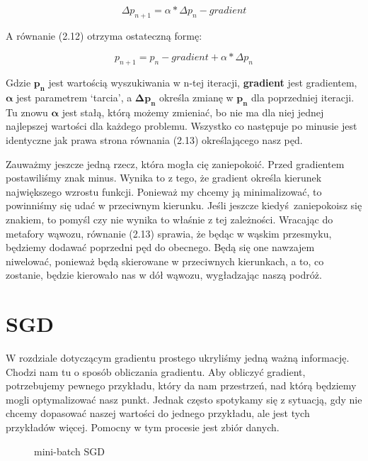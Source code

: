 \begin{equation}
\Delta p_{n+1} = \alpha * \Delta p_n - gradient
\end{equation}

\noindent A równanie (2.12) otrzyma ostateczną formę:

\begin{equation}
p_{n+1} = p_n - gradient + \alpha * \Delta p_n
\end{equation}

\noindent Gdzie $\boldsymbol{p_n}$ jest wartością wyszukiwania w n-tej iteracji, \textbf{gradient} jest gradientem, $\boldsymbol{\alpha}$ jest parametrem ‘tarcia’, a $\boldsymbol{\Delta p_n}$ określa zmianę w $\boldsymbol{p_n}$ dla poprzedniej iteracji. Tu znowu $\boldsymbol{\alpha}$ jest stałą, którą możemy zmieniać, bo nie ma dla niej jednej najlepszej wartości dla każdego problemu. Wszystko co następuje po minusie jest identyczne jak prawa strona równania (2.13) określającego nasz pęd.\newline

Zauważmy jeszcze jedną rzecz, która mogła cię zaniepokoić. Przed gradientem postawiliśmy znak minus. Wynika to z tego, że gradient określa kierunek największego wzrostu funkcji. Ponieważ my chcemy ją minimalizować, to powinniśmy się udać w przeciwnym kierunku. Jeśli jeszcze kiedyś zaniepokoisz się znakiem, to pomyśl czy nie wynika to właśnie z tej zależności. Wracając do metafory wąwozu, równanie (2.13) sprawia, że będąc w wąskim przesmyku, będziemy dodawać poprzedni pęd do obecnego. Będą się one nawzajem niwelować, ponieważ będą skierowane w przeciwnych kierunkach, a to, co zostanie, będzie kierowało nas w dół wąwozu, wygładzając naszą podróż.\newline

\section{SGD}

W rozdziale dotyczącym gradientu prostego ukryliśmy jedną ważną informację. Chodzi nam tu o sposób obliczania gradientu. Aby obliczyć gradient, potrzebujemy pewnego przykładu, który da nam przestrzeń, nad którą będziemy mogli optymalizować nasz punkt. Jednak często spotykamy się z sytuacją, gdy nie chcemy dopasować naszej wartości do jednego przykładu, ale jest tych przykładów więcej. Pomocny w tym procesie jest zbiór danych.\newline

\clearpage
\begin{figure}[H]
\centering

\caption{mini-batch SGD}
\end{figure}
\clearpage

